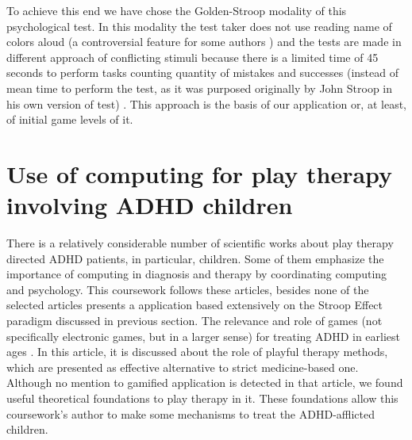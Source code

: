 To achieve this end we have chose the Golden-Stroop modality of this psychological test. In this modality the test taker does not use reading name of colors aloud (a controversial feature for some authors \citep{macleod}) and the tests are made in different approach of conflicting stimuli because there is a limited time of 45 seconds to perform tasks counting quantity of mistakes and successes (instead of mean time to perform the test, as it was purposed originally by John Stroop in his own version of test) \citep{goldencj}. This approach is the basis of our application or, at least, of initial game levels of it.

\section{Use of computing for play therapy involving ADHD children}

There is a relatively considerable number of scientific works about play therapy directed ADHD patients, in particular, children. Some of them emphasize the importance of computing in diagnosis and therapy by coordinating computing and psychology. This coursework follows these articles, besides none of the selected articles presents a application based extensively on the Stroop Effect paradigm discussed in previous section. The relevance and role of games (not specifically electronic games, but in a larger sense) for treating ADHD in earliest ages \citep{Psychoanalytic}. In this article, it is discussed about the role of playful therapy methods, which are presented as effective alternative to strict medicine-based one. Although no mention to gamified application is detected in that article, we found useful theoretical foundations to play therapy in it. These foundations allow this coursework's author to make some mechanisms to treat the ADHD-afflicted children.

